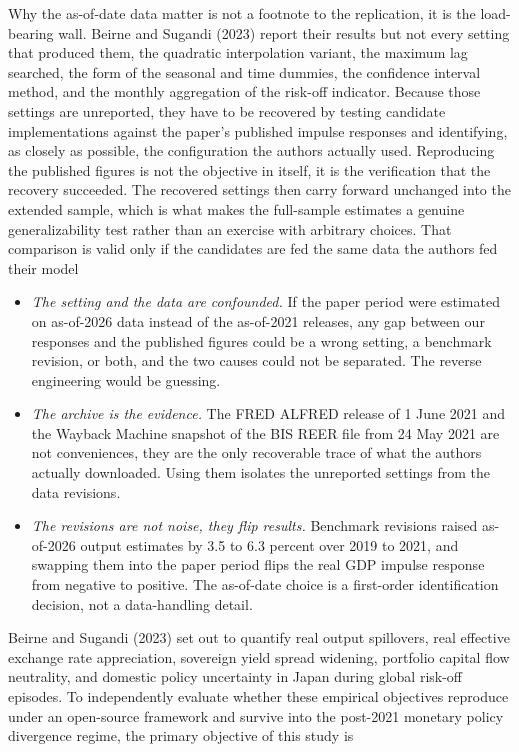Why the as-of-date data matter is not a footnote to the replication, it is the load-bearing wall. Beirne and Sugandi (2023) report their results but not every setting that produced them, the quadratic interpolation variant, the maximum lag searched, the form of the seasonal and time dummies, the confidence interval method, and the monthly aggregation of the risk-off indicator. Because those settings are unreported, they have to be recovered by testing candidate implementations against the paper's published impulse responses and identifying, as closely as possible, the configuration the authors actually used. Reproducing the published figures is not the objective in itself, it is the verification that the recovery succeeded. The recovered settings then carry forward unchanged into the extended sample, which is what makes the full-sample estimates a genuine generalizability test rather than an exercise with arbitrary choices. That comparison is valid only if the candidates are fed the same data the authors fed their model

\begin{itemize}
    \item \textit{The setting and the data are confounded.}
\newline If the paper period were estimated on as-of-2026 data instead of the as-of-2021 releases, any gap between our responses and the published figures could be a wrong setting, a benchmark revision, or both, and the two causes could not be separated. The reverse engineering would be guessing.
    \item \textit{The archive is the evidence.}
\newline The FRED ALFRED release of 1 June 2021 and the Wayback Machine snapshot of the BIS REER file from 24 May 2021 are not conveniences, they are the only recoverable trace of what the authors actually downloaded. Using them isolates the unreported settings from the data revisions.
    \item \textit{The revisions are not noise, they flip results.}
\newline Benchmark revisions raised as-of-2026 output estimates by 3.5 to 6.3 percent over 2019 to 2021, and swapping them into the paper period flips the real GDP impulse response from negative to positive. The as-of-date choice is a first-order identification decision, not a data-handling detail.
\end{itemize}

Beirne and Sugandi (2023) set out to quantify real output spillovers, real effective exchange rate appreciation, sovereign yield spread widening, portfolio capital flow neutrality, and domestic policy uncertainty in Japan during global risk-off episodes. To independently evaluate whether these empirical objectives reproduce under an open-source framework and survive into the post-2021 monetary policy divergence regime, the primary objective of this study is

